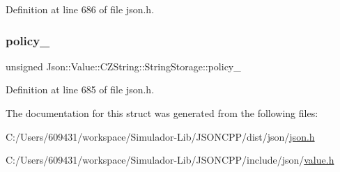 Definition at line 686 of file json.\+h.

\hypertarget{struct_json_1_1_value_1_1_c_z_string_1_1_string_storage_a7f68c8d6197c5692a525854b5f29f87b}{}\label{struct_json_1_1_value_1_1_c_z_string_1_1_string_storage_a7f68c8d6197c5692a525854b5f29f87b} 
\subsubsection{\texorpdfstring{policy\+\_\+}{policy\_}}
{\footnotesize\ttfamily unsigned Json\+::\+Value\+::\+C\+Z\+String\+::\+String\+Storage\+::policy\+\_\+}



Definition at line 685 of file json.\+h.



The documentation for this struct was generated from the following files\+:\begin{DoxyCompactItemize}
\item 
C\+:/\+Users/609431/workspace/\+Simulador-\/\+Lib/\+J\+S\+O\+N\+C\+P\+P/dist/json/\hyperlink{dist_2json_2json_8h}{json.\+h}\item 
C\+:/\+Users/609431/workspace/\+Simulador-\/\+Lib/\+J\+S\+O\+N\+C\+P\+P/include/json/\hyperlink{value_8h}{value.\+h}\end{DoxyCompactItemize}
